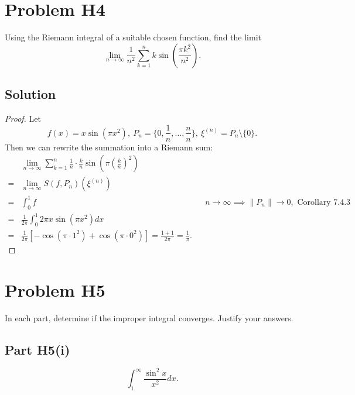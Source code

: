 \documentclass{article}
\theoremstyle{plain}
\newcommand{\ntoinf}{\limits_{n\to\infty}}
\begin{document}
\section*{Problem H4}
Using the Riemann integral of a suitable chosen function, find the limit
\[\lim_{n\to\infty}\frac{1}{n^{2}}\sum_{k=1}^{n}k\sin\left(\frac{\pi k^{2}}{n^{2}}\right).\]
\subsection*{Solution}
\begin{proof}
Let \[f(x)=x\sin(\pi x^{2}),\ P_{n}=\{0,\frac{1}{n},\ldots,\frac{n}{n}\},\
\xi^{(n)}=P_{n}\setminus\{0\}.\]
Then we can rewrite the summation into a Riemann sum:
\begin{align*}
  &\lim\ntoinf\sum_{k=1}^{n}\frac{1}{n}\cdot\frac{k}{n}\sin\left(\pi\left(\frac{k}{n}\right)^{2}\right)\\
  =&\lim\ntoinf S(f, P_{n})(\xi^{(n)})\\
  =&\int_{0}^{1}f&&n\to\infty\implies\|P_{n}\|\to0,\text{ Corollary 7.4.3}\\
  =&\frac{1}{2\pi}\int_{0}^{1}2\pi x\sin(\pi x^{2})dx\\
  =&\frac{1}{2\pi}[-\cos(\pi\cdot1^{2})+\cos(\pi\cdot0^{2})]=\frac{1+1}{2\pi}=\frac{1}{\pi}.
\end{align*}
\end{proof}

\section*{Problem H5}
In each part, determine if the improper integral converges. Justify your answers.
\subsection*{Part H5(i)}
\[\int_{1}^{\infty}\frac{\sin^{2}x}{x^{2}}dx.\]
\end{document}
